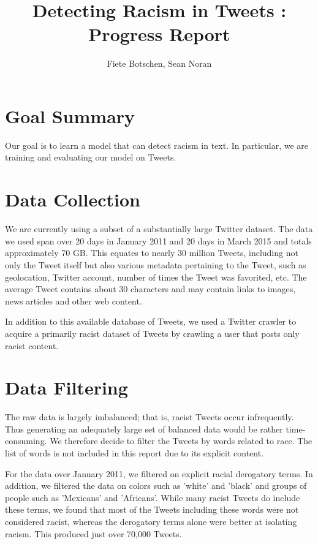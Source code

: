 \documentclass[]{article}
\title{Detecting Racism in Tweets : Progress Report}
\author{Fiete Botschen, Sean Noran}
\begin{document}
\maketitle

\onehalfspacing

\section{Goal Summary}
Our goal is to learn a model that can detect racism in text. In particular, we are training and evaluating our model on Tweets.

\section{Data Collection}

We are currently using a subset of a substantially large Twitter dataset. The data we used span over 20 days in January 2011 and 20 days in March 2015 and totals approximately 70 GB. This equates to nearly 30 million Tweets, including not only the Tweet itself but also various metadata pertaining to the Tweet, such as geolocation, Twitter account, number of times the Tweet was favorited, etc. The average Tweet contains about 30 characters and may contain links to images, news articles and other web content.

In addition to this available database of Tweets, we used a Twitter crawler to acquire a primarily racist dataset of Tweets by crawling a user that posts only racist content.

\section{Data Filtering}

The raw data is largely imbalanced; that is, racist Tweets occur infrequently. Thus generating an adequately large set of balanced data would be rather time-consuming. We therefore decide to filter the Tweets by words related to race. The list of words is not included in this report due to its explicit content.

For the data over January 2011, we filtered on explicit racial derogatory terms. In addition, we filtered the data on colors such as 'white' and 'black' and groups of people such as 'Mexicans' and 'Africans'. While many racist Tweets do include these terms, we found that most of the Tweets including these words were not considered racist, whereas the derogatory terms alone were better at isolating racism. This produced just over 70,000 Tweets.
\end{document}
